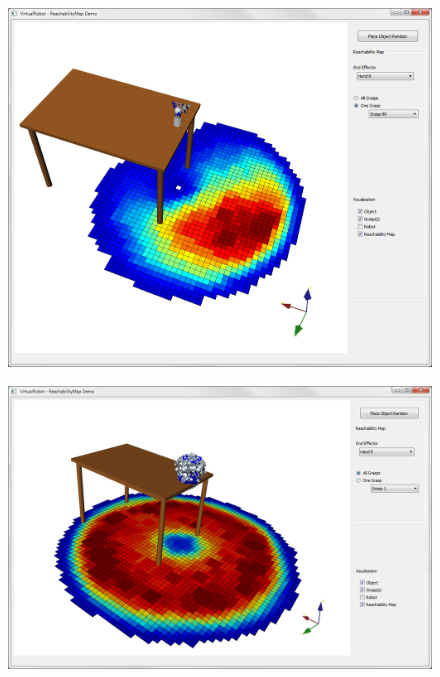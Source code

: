 \begin{itemize}
\begin{figure}[H]
\begin{minipage} {.45\linewidth}
	  \includegraphics[width=\linewidth]{Reachmap}
	\end{minipage}
\end{figure}
\begin{figure}[H]
	\centering
	\begin{minipage} {.45\linewidth}
	  \includegraphics[width=\linewidth]{ReachMapAll}
	\end{minipage}
\end{figure}
\end{itemize}
